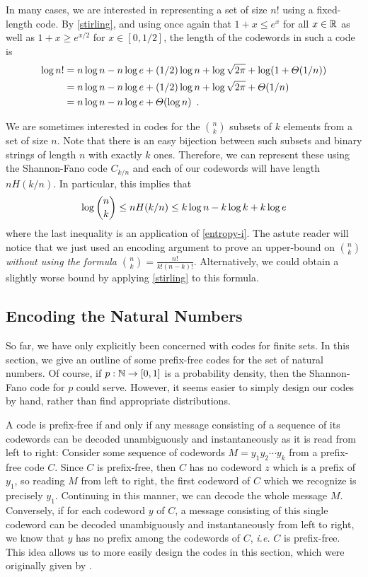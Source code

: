 \documentclass[format=acmsmall, review=false, screen=true]{acmart}
\begin{document}
In many cases, we are interested in representing a set of size $n!$
using a fixed-length code.  By \eqref{stirling}, and using once again
that $1+x \leq e^x$ for all $x \in \mathbb{R}$ as well as
$1+x \geq e^{x/2}$ for $x \in [0, 1/2]$, the length 
of the codewords in such a code is
\begin{align}
  \log n!
  & = n\log n - n\log e + (1/2)\log n + \log \sqrt{2 \pi} + \log(1+\varTheta(1/n)) \notag \\
  & = n\log n - n\log e + (1/2)\log n + \log \sqrt{2 \pi} + \varTheta(1/n) \notag \\
  & = n\log n - n\log e + \varTheta(\log n) \eqlabel{stirling-loose}
    \enspace .
\end{align}

We are sometimes interested in codes for the $\binom{n}{k}$ subsets of
$k$ elements from a set of size $n$. Note that there is an easy
bijection between such subsets and binary strings of length $n$ with
exactly $k$ ones. Therefore, we can represent these using the
Shannon-Fano code $C_{k/n}$ and each of our codewords will have length
$nH(k/n)$.  In particular, this implies that
\begin{equation}
  \log\binom{n}{k} \le nH(k/n) \le k\log n - k\log k + k\log e 
  \eqlabel{log-n-choose-k}
\end{equation}
where the last inequality is an application of \eqref{entropy-i}. The
astute reader will notice that we just used an encoding argument to
prove an upper-bound on $\binom{n}{k}$ \emph{without using the 
formula $\binom{n}{k}=\frac{n!}{k! (n - k)!}$}. Alternatively, we 
could obtain a slightly worse bound by applying 
\eqref{stirling} to this formula.

\subsection{Encoding the Natural Numbers}

So far, we have only explicitly been concerned with codes for finite
sets. In this section, we give an outline of some
prefix-free codes for the set of natural numbers. Of course, if $p :
\mathbb{N} \to [0, 1]$ is a probability density, then the Shannon-Fano code
for $p$ could serve. However, it seems easier to simply design our
codes by hand, rather than find appropriate distributions.

A code is prefix-free if and only if any message consisting of a
sequence of its codewords can be decoded unambiguously and
instantaneously as it is read from left to right: Consider some
sequence of codewords $M = y_1 y_2 \cdots y_k$ from a prefix-free code
$C$. Since $C$ is prefix-free, then $C$ has no codeword $z$ which is a
prefix of $y_1$, so reading $M$ from left to right, the first codeword
of $C$ which we recognize is precisely $y_1$. Continuing in this
manner, we can decode the whole message $M$. Conversely, if for each
codeword $y$ of $C$, a message consisting of this single codeword can
be decoded unambiguously and instantaneously from left to right, we
know that $y$ has no prefix among the codewords of $C$, \emph{i.e.}
$C$ is prefix-free. 
This idea allows us to more easily design
the codes in this section, which were originally given by
.
\end{document}
